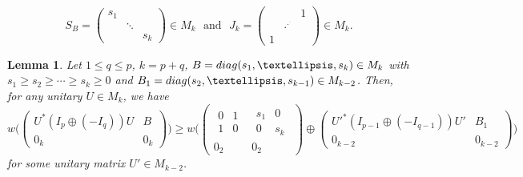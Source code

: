 \documentclass[10pt,a4paper]{amsart}
\newtheorem{lemma}{Lemma}
\def\diag{{\rm diag}}
\def\rddots{\cdot^{\displaystyle\cdot^{\displaystyle\cdot}}}
\begin{document}
\begin{equation}\label{eq1}
S_B=\begin{pmatrix} s_1 & & \\ & \ddots & \\ & & s_k\end{pmatrix}\in M_k \ \ \ \mbox{and} \ \ \ J_k=\begin{pmatrix} & & 1\\ & \rddots & \\ 1 & & \end{pmatrix}\in M_k.
\end{equation}

\begin{lemma}\label{l35}
Let $1\le q\le p$, $k=p+q$, $B=\diag(s_1, \dots, s_k)\in M_k$ with $s_1\ge s_2\ge \cdots\ge s_k\ge 0$ and $B_1=\diag(s_{2}, \dots, s_{k-1})\in M_{k-2}$. Then, for any unitary $U\in M_k$, we have
$$
 w\Big(\begin{pmatrix} U^*(I_p\oplus (-I_q))U & B\\ 0_k & 0_k\end{pmatrix}\Big)
\ge   w\Big(\left(\begin{array}{c|c}\begin{array}{cc} 0 & 1\\ 1 & 0\end{array} & \begin{array}{cc} s_1 & 0\\ 0 & s_k\end{array}
\\ \hline 0_2 & 0_2\end{array}\right)\oplus
\begin{pmatrix} {U'}^*(I_{p-1}\oplus (-I_{q-1}))U' & B_1\\ 0_{k-2} & 0_{k-2}\end{pmatrix}\Big) $$
for some unitary matrix $U'\in M_{k-2}$.
\end{lemma}
\end{document}
